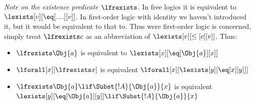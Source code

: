 \documentclass[../../../../include/open-logic-section]{subfiles}
\begin{document}
\emph{Note on the existence predicate $\lfrexists$}. In free logics
it is equivalent to $\lexists[v][\eq[\ldots][v]]$. In first-order
logic with identity we haven't introduced it, but it would be
equivalent to that to. Thus were first-order logic is concerned,
simply treat $\lfrexists c$ as an abbreviation of
 $\lexists[v][\leq[c][v]]$.
Thus:
\begin{itemize}
    \item $\lfrexists \Obj{a}$ is 
    equivalent to $\lexists[x][\eq[\Obj{a}][x]]$
    \item $\lforall[x][\lfrexists x]$ is 
    equivalent $\lforall[x][\lexists[y][\eq[x][y]]]$
    \item $\lfrexists\Obj{a}\lif\Subst{!A}{\Obj{a}}{x}$ is 
    equivalent $\lexists[y][\eq[\Obj{a}][y]]\lif\Subst{!A}{\Obj{a}}{x}$
\end{itemize}
\end{document}
